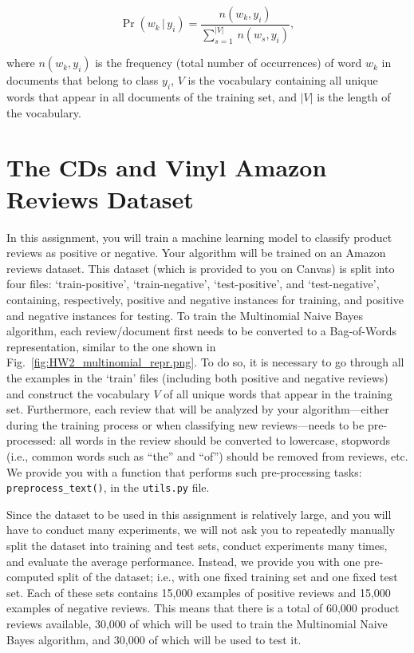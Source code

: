 \documentclass{article}
\begin{document}
\begin{equation}
   \Pr(w_k \, | \, y_i) = \frac{n(w_k, y_i)}{\sum_{s=1}^{|V|} \, n(w_s, y_i)},
\end{equation}

\noindent where $n(w_k, y_i)$ is the frequency (total number of occurrences) of word $w_k$ in documents that belong to class $y_i$, $V$ is the vocabulary containing all unique words that appear in all documents of the training set, and $|V|$ is the length of the vocabulary.






\vspace{0.5cm}
\section{The CDs and Vinyl Amazon Reviews Dataset}
\vspace{0.25cm}

In this assignment, you will train a machine learning model to classify product reviews as positive or negative. Your algorithm will be trained on an Amazon reviews dataset. This dataset (which is provided to you on Canvas) is split into four files: ‘train-positive’, ‘train-negative’, ‘test-positive’, and ‘test-negative’, containing, respectively, positive and negative instances for training, and positive and negative instances for testing. To train the Multinomial Naive Bayes algorithm, each review/document first needs to be converted to a Bag-of-Words representation, similar to the one shown in Fig.~\ref{fig:HW2_multinomial_repr.png}. To do so, it is necessary to go through all the examples in the ‘train’ files (including both positive and negative reviews) and construct the vocabulary $V$ of all unique words that appear in the training set. Furthermore, each review that will be analyzed by your algorithm---either during the training process or when classifying new reviews---needs to be pre-processed: all words in the review should be converted to lowercase, stopwords (i.e., common words such as ``the'' and ``of'') should be removed from reviews, etc. We provide you with a function that performs such pre-processing tasks: \texttt{preprocess\_text()}, in the \texttt{utils.py} file. 
\vspace{0.5cm}

\noindent Since the dataset to be used in this assignment is relatively large, and you will have to conduct many experiments, we will not ask you to repeatedly manually split the dataset into training and test sets, conduct experiments many times, and evaluate the average performance. Instead, we provide you with one pre-computed split of the dataset; i.e., with one fixed training set and one fixed test set. Each of these sets contains 15,000 examples of positive reviews and 15,000 examples of negative reviews. This means that there is a total of 60,000 product reviews available, 30,000 of which will be used to train the Multinomial Naive Bayes algorithm, and 30,000 of which will be used to test it.
\vspace{0.5cm}
\end{document}
